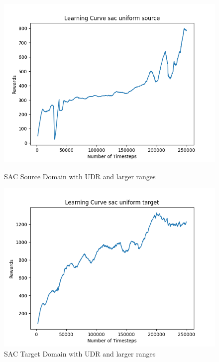 \documentclass[11pt]{article}
\begin{document}
\begin{figure}[H]
    \centering
    \begin{minipage}{0.45\textwidth}
        \centering
        \includegraphics[width=\textwidth]{../images/Learning_Curve_SAC_Uniform_Large_Source.png}
        \caption{SAC Source Domain with UDR and larger ranges}
        \label{fig:sac_source_udr_larger}
    \end{minipage}
    \hfill
    \begin{minipage}{0.45\textwidth}
        \centering
        \includegraphics[width=\textwidth]{../images/Learning_Curve_SAC_Uniform_Large_Target.png}
        \caption{SAC Target Domain with UDR and larger ranges}
        \label{fig:sac_target_udr_larger}

\end{minipage}
\end{figure}
\end{document}
